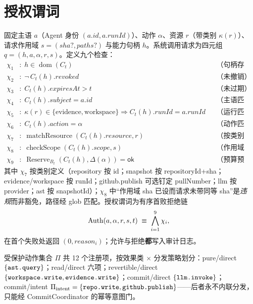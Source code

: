 \section{授权谓词}\label{sec:auth}

\begin{definition}[授权谓词]\label{def:auth}
固定主语 $a$（Agent 身份 $(a.id,a.runId)$）、动作 $\alpha$、资源 $r$（带类别 $\kappa(r)$）、请求作用域 $s=(sha?,paths?)$ 与能力句柄 $h$。系统调用请求为四元组 $q=(h,a,\alpha,r,s)$。定义九个检查：
\begin{align}
\chi_1&:\; h\in\operatorname{dom}(C_t) & &\text{（句柄存在）}\nonumber\\
\chi_2&:\; \neg\, C_t(h).revoked & &\text{（未撤销）}\nonumber\\
\chi_3&:\; C_t(h).expiresAt > t & &\text{（未过期）}\nonumber\\
\chi_4&:\; C_t(h).subject = a.id & &\text{（主语匹配）}\nonumber\\
\chi_5&:\; \kappa(r)\in\{\text{evidence},\text{workspace}\} \Rightarrow C_t(h).runId = a.runId & &\text{（运行匹配）}\nonumber\\
\chi_6&:\; C_t(h).action = \alpha & &\text{（动作匹配）}\nonumber\\
\chi_7&:\; \operatorname{matchResource}(C_t(h).resource, r) & &\text{（按类别资源匹配）}\nonumber\\
\chi_8&:\; \operatorname{checkScope}(C_t(h).scope, s) & &\text{（作用域匹配）}\nonumber\\
\chi_9&:\; \operatorname{Reserve}_{B_t}(C_t(h),\Delta(\alpha))=\mathsf{ok} & &\text{（预算预留）}\nonumber
\end{align}
其中 $\chi_7$ 按类别定义（repository 按 id；snapshot 按 repositoryId+sha；evidence/workspace 按 runId；github.publish 可选钉定 pullNumber；llm 按 provider；ast 按 snapshotId）；$\chi_8$ 中“作用域 sha 已设而请求未带同等 sha”是\emph{违规}而非豁免，路径经 glob 匹配。授权谓词为有序首败拒绝链
\begin{equation}
\operatorname{Auth}(a,\alpha,r,s,t) \;\equiv\; \bigwedge_{i=1}^{9}\chi_i,
\end{equation}
在首个失败处返回 $(0,reason_i)$；允许与拒绝\textbf{都}写入审计日志。
\end{definition}

受保护动作集合 $\Pi$ 共 12 个注册项，按效果类 $\times$ 分发策略划分：pure/direct $\{\texttt{ast.query}\}$；read/direct 六项；revertible/direct $\{\texttt{workspace.write},\texttt{evidence.write}\}$；commit/direct $\{\texttt{llm.invoke}\}$；commit/intent $\Pi_{\mathrm{intent}}=\{\texttt{repo.write},\texttt{github.publish}\}$——后者永不内联分发，只能经 CommitCoordinator 的幂等意图门。

